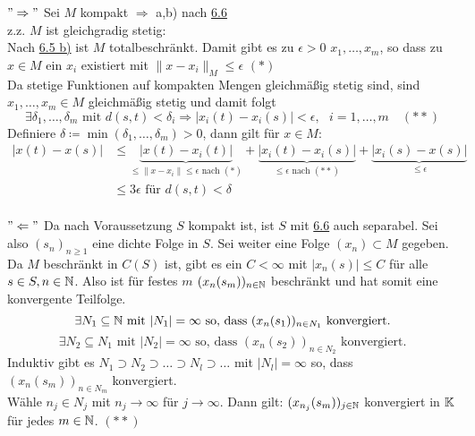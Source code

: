 \begin{beweis}
	$"\Rightarrow"$ Sei $M$ kompakt $\Rightarrow$ a,b) nach \hyperref[prop:6.6]{6.6} \\
	z.z. $M$ ist gleichgradig stetig: \\
	Nach \hyperref[satz:6.5b]{6.5 b)} ist $M$ totalbeschränkt. Damit gibt es zu $\epsilon > 0$ $x_{1}, \dotsc, x_{m}$, so dass zu $x \in M$ ein $x_{i}$ existiert mit $\| x - x_{i} \|_{M} \leq \epsilon$ $(*)$ \\
	Da stetige Funktionen auf kompakten Mengen gleichmä{\ss}ig stetig sind, sind$x_{1}, \dotsc, x_{m} \in M$ gleichmä{\ss}ig stetig und damit folgt 
	\[ \exists \delta_{1}, \dotsc, \delta_{m} \text{ mit } d(s, t) < \delta_{i} \Rightarrow |x_{i}(t) - x_{i}(s)| < \epsilon, \text{ } i = 1, \dotsc, m \quad (**) \]
	Definiere $\delta \coloneqq \min(\delta_{1}, \dotsc, \delta_{m}) > 0$, dann gilt für $x \in M$:
	\begin{align*}
		| x(t) - x(s) | & \leq \underbrace{| x(t) - x_{i}(t) |}_{\leq \| x - x_{i} \| \leq \epsilon \text{ nach } (*) } + \underbrace{| x_{i}(t) - x_{i}(s) |}_{\leq \epsilon \text{ nach } (**) } + \underbrace{| x_{i}(s) - x(s) |}_{\leq \epsilon} \\
						& \leq 3 \epsilon \text{ für } d(s, t) < \delta 
	\end{align*} \\
	$"\Leftarrow"$ Da nach Voraussetzung $S$ kompakt ist, ist $S$ mit \hyperref[prop:6.6]{6.6} auch separabel. Sei also $(s_{n})_{n \geq 1}$ eine dichte Folge in $S$. Sei weiter eine Folge $(x_{n}) \subset M$ gegeben. \\
	Da $M$ beschränkt in $C(S)$ ist, gibt es ein $C < \infty$ mit $| x_{n}(s) | \leq C$ für alle $s \in S, n \in \mathbb{N}$. Also ist für festes $m$ $(x_{n}(s_{m}))_{n \in \mathbb{N}}$ beschränkt und hat somit eine konvergente Teilfolge. \\
	\[ \exists N_{1} \subseteq \mathbb{N} \text{ mit } |N_{1}| = \infty \text{ so, dass } (x_{n}(s_{1}))_{n \in N_{1}} \text{ konvergiert.}  \]
	\[ \exists N_{2} \subseteq N_{1} \text{ mit } |N_{2}| = \infty \text{ so, dass } (x_{n}(s_{2}))_{n \in N_{2}} \text{ konvergiert.}  \]	
	Induktiv gibt es $N_{1} \supset N_{2} \supset \dotsc \supset N_{l} \supset \dotsc$ mit $|N_{l}| = \infty$ so, dass $(x_{n}(s_{m}))_{n \in N_{m}}$ konvergiert. \\
	Wähle $n_{j} \in N_{j}$ mit $n_{j} \rightarrow \infty$ für $j \rightarrow \infty$. Dann gilt: $(x_{n_{j}}(s_{m}))_{j \in \mathbb{N}}$ konvergiert in $\mathbb{K}$ für jedes $m \in \mathbb{N}$. $(**)$ \\

\end{beweis}
